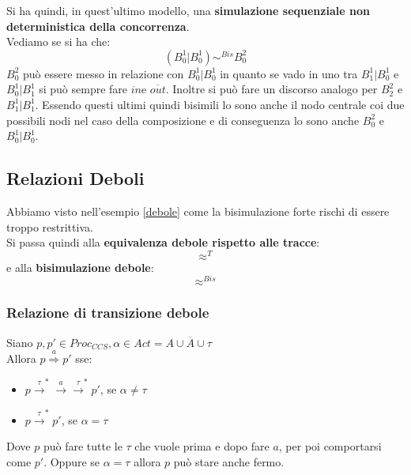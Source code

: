 \begin{esempio}
\begin{center}
  \end{center}
  Si ha quindi, in quest'ultimo modello, una \textbf{simulazione sequenziale non
    deterministica della concorrenza}.\\
  Vediamo se si ha che:
  \[(B_0^1|B_0^1)\sim^{Bis}B_0^2\]
  $B_0^2$ può essere messo in relazione con $B_0^1|B_0^1$ in quanto se vado in
  uno tra $B_1^1|B_0^1$ e $B_0^1|B_1^1$ si può sempre fare $in $e
  $\overline{out}$. Inoltre si può fare un discorso analogo per $B_2^2$ e
  $B_1^1|B_1^1$. Essendo questi ultimi quindi bisimili lo sono anche il nodo
  centrale coi due possibili nodi nel caso della composizione e di conseguenza
  lo sono anche $B_0^2$ e $B_0^1|B_0^1$.
\end{esempio}
\subsection{Relazioni Deboli}
Abbiamo visto nell'esempio \ref{debole} come la bisimulazione forte rischi di
essere troppo restrittiva.\\
Si passa quindi alla \textbf{equivalenza debole rispetto alle tracce}:
\[\approx^{T}\]
e alla \textbf{bisimulazione debole}:
\[\approx^{Bis}\]
\subsubsection{Relazione di transizione debole}
\begin{definizione}
  Siano $p,p' \in Proc_{CCS}, \alpha \in Act=A\cup \overline{A}\cup \tau$\\
  Allora $p\stackrel{a}{\Rightarrow}p'$ sse:
  \begin{itemize}
      \item $p\stackrel{\tau}{\rightarrow}^*
      \stackrel{a}{\rightarrow}\stackrel{\tau}{\rightarrow}^*p'$, se $\alpha \neq \tau$
      \item   $p\stackrel{\tau}{\rightarrow}^*p'$, se $\alpha = \tau$
  \end{itemize}
\end{definizione} \vspace{5mm} %
Dove $p$ può fare tutte le $\tau$ che vuole prima e dopo fare $a$, per poi comportarsi come $p'$. Oppure se $\alpha = \tau$ allora $p$ può stare anche fermo.
